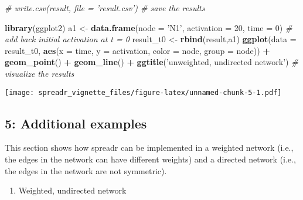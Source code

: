 \documentclass[]{article}
\newenvironment{Shaded}{\begin{snugshade}}{\end{snugshade}}
\newcommand{\KeywordTok}[1]{\textcolor[rgb]{0.13,0.29,0.53}{\textbf{#1}}}
\newcommand{\DataTypeTok}[1]{\textcolor[rgb]{0.13,0.29,0.53}{#1}}
\newcommand{\DecValTok}[1]{\textcolor[rgb]{0.00,0.00,0.81}{#1}}
\newcommand{\StringTok}[1]{\textcolor[rgb]{0.31,0.60,0.02}{#1}}
\newcommand{\CommentTok}[1]{\textcolor[rgb]{0.56,0.35,0.01}{\textit{#1}}}
\newcommand{\OperatorTok}[1]{\textcolor[rgb]{0.81,0.36,0.00}{\textbf{#1}}}
\newcommand{\NormalTok}[1]{#1}
\providecommand{\tightlist}{%
  \setlength{\itemsep}{0pt}\setlength{\parskip}{0pt}}
\begin{document}
\begin{Shaded}
\begin{Highlighting}[]
\CommentTok{# write.csv(result, file = 'result.csv') # save the results }

\KeywordTok{library}\NormalTok{(ggplot2) }
\NormalTok{a1 <-}\StringTok{ }\KeywordTok{data.frame}\NormalTok{(}\DataTypeTok{node =} \StringTok{'N1'}\NormalTok{, }\DataTypeTok{activation =} \DecValTok{20}\NormalTok{, }\DataTypeTok{time =} \DecValTok{0}\NormalTok{) }\CommentTok{# add back initial activation at t = 0}
\NormalTok{result_t0 <-}\StringTok{ }\KeywordTok{rbind}\NormalTok{(result,a1)}
\KeywordTok{ggplot}\NormalTok{(}\DataTypeTok{data =}\NormalTok{ result_t0, }\KeywordTok{aes}\NormalTok{(}\DataTypeTok{x =}\NormalTok{ time, }\DataTypeTok{y =}\NormalTok{ activation, }\DataTypeTok{color =}\NormalTok{ node, }\DataTypeTok{group =}\NormalTok{ node)) }\OperatorTok{+}
\StringTok{  }\KeywordTok{geom_point}\NormalTok{() }\OperatorTok{+}\StringTok{ }\KeywordTok{geom_line}\NormalTok{() }\OperatorTok{+}\StringTok{ }\KeywordTok{ggtitle}\NormalTok{(}\StringTok{'unweighted, undirected network'}\NormalTok{) }\CommentTok{# visualize the results }
\end{Highlighting}
\end{Shaded}

\texttt{[image: spreadr\_vignette\_files/figure-latex/unnamed-chunk-5-1.pdf]}

\subsection{5: Additional examples}\label{additional-examples}

This section shows how spreadr can be implemented in a weighted network
(i.e., the edges in the network can have different weights) and a
directed network (i.e., the edges in the network are not symmetric).

\begin{enumerate}
\def\labelenumi{(\roman{enumi})}
\tightlist
\item
  Weighted, undirected network
\end{enumerate}
\end{document}

